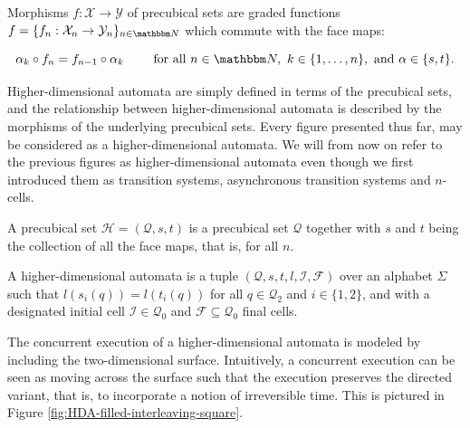     \begin{definition}
        \label{def:morphism-of-precubical-set}
        Morphisms $f: \mathcal{X}\to \mathcal{Y}$ of precubical sets are graded functions $f=\{ f_n: \mathcal{X}_n\to \mathcal{Y}_n\}_{ n\in \Nat}$ which commute with the face maps:
        
        \begin{equation*}
            \alpha_k\circ f_n= f_{ n- 1}\circ \alpha_k \qquad\ \text{for all}\ n\in \Nat,\ k\in\{ 1,\dots, n\},\ \text{and}\ \alpha\in\{ s, t\}.
        \end{equation*}
    \end{definition}

    Higher-dimensional automata are simply defined in terms of the precubical sets, and the relationship between higher-dimensional automata is described by the morphisms of the underlying precubical sets. Every figure presented thus far, may be considered as a higher-dimensional automata. We will from now on refer to the previous figures as higher-dimensional automata even though we first introduced them as transition systems, asynchronous transition systems and $n$-cells.
    
    \begin{definition}
        \label{def:higher-dimensional-automata}
        A precubical set $\mathcal{H} = (\mathcal{Q},s,t)$ is a precubical set $\mathcal{Q}$ together with $s$ and $t$ being the collection of all the face maps, that is, for all $n$. 
        
        A higher-dimensional automata is a tuple $(\mathcal{Q}, s, t, l, \mathcal{I}, \mathcal{F})$ over an alphabet $\Sigma$ such that $l(s_i(q)) = l(t_i(q))$ for all $q \in \mathcal{Q}_2$ and $i \in \{1,2\}$, and with a designated initial cell $\mathcal{I} \in \mathcal{Q}_0$ and $\mathcal{F} \subseteq \mathcal{Q}_0$ final cells.

    \end{definition}

    The concurrent execution of a higher-dimensional automata is modeled by including the two-dimensional surface. Intuitively, a concurrent execution can be seen as moving across the surface such that the execution preserves the directed variant, that is, to incorporate a notion of irreversible time. This is pictured in Figure \ref{fig:HDA-filled-interleaving-square}. 
    
